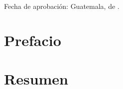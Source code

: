 \documentclass[11pt, letterpaper, twoside, openright]{report}
\newcommand{\defaultparformat}[1]{
	{\setlength{\parskip}{2ex}
     }
}
\begin{document}
    Fecha de aprobación: Guatemala, \mesaprobacion de \anoaprobacion. %
	\normalsize
\fi

\pagestyle{plain}
\ifdefined\CAPprefacio
	\newpage
	\cleardoublepage{}
    \chapter*{Prefacio}
    \ifdefined\parpordefecto
    	\defaultparformat{a-prefacio}
    \else
    	
    \fi
\fi

\ifdefined\CAPindice
	\newpage
    \cleardoublepage{}
	\renewcommand{\contentsname}{Índice}
    \pdfbookmark{\contentsname}{toc}
	\tableofcontents
\fi

\ifdefined\CAPfiguras
	\newpage
    \cleardoublepage{}
	\renewcommand{\listfigurename}{Lista de figuras}
	\listoffigures
\fi

\ifdefined\CAPcuadros
	\newpage
    \cleardoublepage{}
	\renewcommand{\listtablename}{Lista de cuadros}
	\listoftables
\fi

\ifdefined\CAPresumen
	\newpage
    \cleardoublepage{}
	\chapter*{Resumen}
	\ifdefined\parpordefecto
		\defaultparformat{b-resumen}
	\else
		
	\fi
\fi
\end{document}
